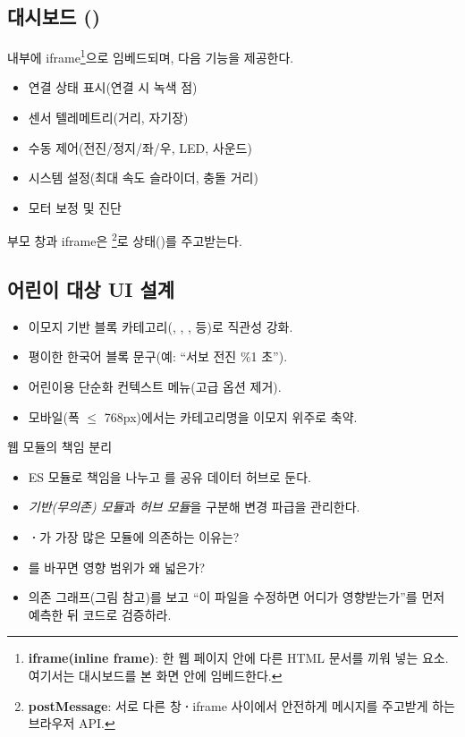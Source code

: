 \subsection{대시보드 ()}

 내부에 iframe\footnote{\textbf{iframe(inline frame)}: 한 웹 페이지 안에 다른
HTML 문서를 끼워 넣는 요소. 여기서는 대시보드를 본 화면 안에 임베드한다.}으로 임베드되며,
다음 기능을 제공한다.

\begin{itemize}
  \item 연결 상태 표시(연결 시 녹색 점)
  \item 센서 텔레메트리(거리, 자기장)
  \item 수동 제어(전진/정지/좌/우, LED, 사운드)
  \item 시스템 설정(최대 속도 슬라이더, 충돌 거리)
  \item 모터 보정 및 진단
\end{itemize}

부모 창과 iframe은 \footnote{\textbf{postMessage}: 서로 다른 창\textbf{·}iframe
사이에서 안전하게 메시지를 주고받게 하는 브라우저 API.}로 상태()를 주고받는다.

\subsection{어린이 대상 UI 설계}

\begin{itemize}
  \item 이모지 기반 블록 카테고리(, , ,  등)로
        직관성 강화.
  \item 평이한 한국어 블록 문구(예: ``서보 전진 \%1 초'').
  \item 어린이용 단순화 컨텍스트 메뉴(고급 옵션 제거).
  \item 모바일(폭 $\le$ 768px)에서는 카테고리명을 이모지 위주로 축약.
\end{itemize}

\begin{teachbox}{웹 모듈의 책임 분리}
\begin{itemize}
  \item ES 모듈로 책임을 나누고 를 공유 데이터 허브로 둔다.
  \item \emph{기반(무의존) 모듈}과 \emph{허브 모듈}을 구분해 변경 파급을 관리한다.
\end{itemize}
\begin{itemize}
  \item {}\textbf{·}가 가장 많은 모듈에 의존하는 이유는?
  \item {}를 바꾸면 영향 범위가 왜 넓은가?
\end{itemize}
\begin{itemize}
  \item 의존 그래프(그림 참고)를 보고 ``이 파일을 수정하면 어디가 영향받는가''를 먼저 예측한 뒤 코드로 검증하라.
\end{itemize}
\end{teachbox}

